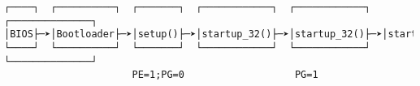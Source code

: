 \documentclass[varwidth=60em]{standalone}
\begin{document}
\begin{verbatim}
┌────┐  ┌──────────┐  ┌───────┐  ┌────────────┐  ┌────────────┐  ┌──────────────┐
│BIOS├─➤│Bootloader├─➤│setup()├─➤│startup_32()├─➤│startup_32()├─➤│start_kernel()│
└────┘  └──────────┘  └───────┘  └────────────┘  └────────────┘  └──────────────┘
                      PE=1;PG=0                   PG=1
\end{verbatim}
\end{document}
